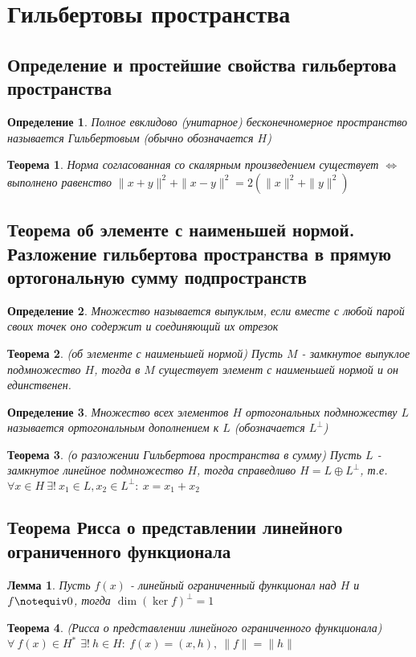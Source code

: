 \documentclass[9pt, a4paper]{extarticle}
\newtheorem{theorem}{Теорема}
\newtheorem{lemma}{Лемма}
\newtheorem{definition}{Определение}
\numberwithin{equation}{section}
\numberwithin{lemma}{section}
\numberwithin{definition}{section}
\numberwithin{notabene}{section}
\numberwithin{corollary}{section}
\begin{document}
	\section{Гильбертовы пространства}
	\subsection{Определение и простейшие свойства гильбертова пространства}
	\begin{definition}
		Полное евклидово (унитарное) бесконечномерное пространство называется Гильбертовым (обычно обозначается $H$)
	\end{definition}
	\begin{theorem}
		Норма согласованная со скалярным произведением существует $\Leftrightarrow$ выполнено равенство $\|x+y\|^2 + \|x-y\|^2 = 2 \left(\|x\|^2 + \|y\|^2\right)$
	\end{theorem}
	\subsection{Теорема об элементе с наименьшей нормой. Разложение гильбертова пространства
		в прямую ортогональную сумму подпространств }
	\begin{definition}
		Множество называется выпуклым, если вместе с любой парой своих точек оно содержит и соединяющий их отрезок		
	\end{definition}
	\begin{theorem}
		(об элементе с наименьшей нормой)\newline
		Пусть $M$ - замкнутое выпуклое подмножество $H$, тогда в $M$ существует элемент с наименьшей нормой и он единственен.
	\end{theorem}
	\begin{definition}
		Множество всех элементов $H$ ортогональных подмножеству $L$ называется ортогональным дополнением к $L$ (обозначается $L^\perp$)
	\end{definition}
	\begin{theorem}
		(о разложении Гильбертова пространства в сумму)\newline
		Пусть $L$ - замкнутое линейное подмножество $H$, тогда справедливо $H = L \oplus L^\perp$, т.е. $\forall x \in H \  \exists! \  x_1 \in L, x_2 \in L^\perp: \ x = x_1 + x_2$
	\end{theorem}
	\subsection{Теорема Рисса о представлении линейного ограниченного функционала}
	\begin{lemma}
		Пусть $f(x)$ - линейный ограниченный функционал над $H$ и $f \notequiv 0$, тогда $\dim{\left(\ker{f}\right)^\perp} = 1$
	\end{lemma}
	\begin{theorem}
		(Рисса о представлении линейного ограниченного функционала)\newline
		$\forall \ f(x) \in H^{*}$ $\exists! \ h \in H: \ f(x) = (x,h), \ \|f\| = \|h\|$
	\end{theorem}
\end{document}
